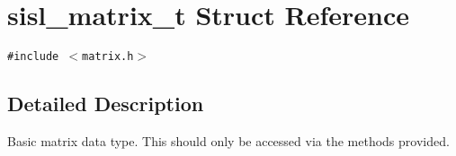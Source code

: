 \hypertarget{structsisl__matrix__t}{
\section{sisl\_\-matrix\_\-t  Struct Reference}
\label{structsisl__matrix__t}
}
{\tt \#include $<$matrix.h$>$}



\subsection{Detailed Description}
Basic matrix data type. This should only be accessed via the methods provided. 

